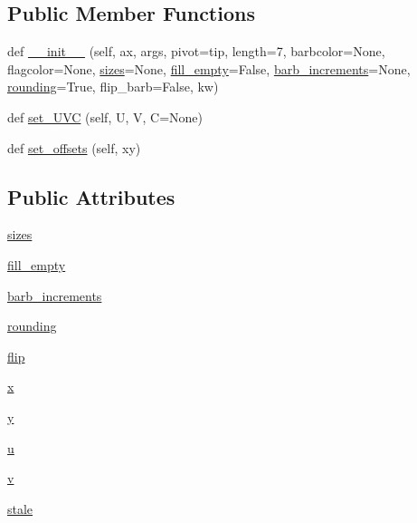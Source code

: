 \subsection*{Public Member Functions}
\begin{DoxyCompactItemize}
\item 
def \hyperlink{classmatplotlib_1_1quiver_1_1Barbs_a7c8dec1ccbe4ab0caf9fcd4a13e77488}{\+\_\+\+\_\+init\+\_\+\+\_\+} (self, ax, args, pivot=\textquotesingle{}tip\textquotesingle{}, length=7, barbcolor=None, flagcolor=None, \hyperlink{classmatplotlib_1_1quiver_1_1Barbs_a06f1946ae1eaf6fb7f2e7ad12fd95360}{sizes}=None, \hyperlink{classmatplotlib_1_1quiver_1_1Barbs_a88c2902650f34aa8e23060a0891b61fb}{fill\+\_\+empty}=False, \hyperlink{classmatplotlib_1_1quiver_1_1Barbs_a49c13662e7240845848dd46d9ba79ea5}{barb\+\_\+increments}=None, \hyperlink{classmatplotlib_1_1quiver_1_1Barbs_ab46003486181cfa9f8efcdbc39008426}{rounding}=True, flip\+\_\+barb=False, kw)
\item 
def \hyperlink{classmatplotlib_1_1quiver_1_1Barbs_a963364dac5799ec94485ab80c5ea9de4}{set\+\_\+\+U\+VC} (self, U, V, C=None)
\item 
def \hyperlink{classmatplotlib_1_1quiver_1_1Barbs_ab1500541958a20b317abe5ec916bc681}{set\+\_\+offsets} (self, xy)
\end{DoxyCompactItemize}
\subsection*{Public Attributes}
\begin{DoxyCompactItemize}
\item 
\hyperlink{classmatplotlib_1_1quiver_1_1Barbs_a06f1946ae1eaf6fb7f2e7ad12fd95360}{sizes}
\item 
\hyperlink{classmatplotlib_1_1quiver_1_1Barbs_a88c2902650f34aa8e23060a0891b61fb}{fill\+\_\+empty}
\item 
\hyperlink{classmatplotlib_1_1quiver_1_1Barbs_a49c13662e7240845848dd46d9ba79ea5}{barb\+\_\+increments}
\item 
\hyperlink{classmatplotlib_1_1quiver_1_1Barbs_ab46003486181cfa9f8efcdbc39008426}{rounding}
\item 
\hyperlink{classmatplotlib_1_1quiver_1_1Barbs_af39393a7267578bd4adb5d3a5e673c40}{flip}
\item 
\hyperlink{classmatplotlib_1_1quiver_1_1Barbs_a79eda277a699d588bd88ebf2d7be9306}{x}
\item 
\hyperlink{classmatplotlib_1_1quiver_1_1Barbs_a3137a5e02dce7821d54630c32c83e783}{y}
\item 
\hyperlink{classmatplotlib_1_1quiver_1_1Barbs_afc79728b9563ca2941cb2cc11d7e552f}{u}
\item 
\hyperlink{classmatplotlib_1_1quiver_1_1Barbs_a02ffc7b07abef03235c448606c614f4a}{v}
\item 
\hyperlink{classmatplotlib_1_1quiver_1_1Barbs_a00d30daf4856d2c5ee985913ebc87d80}{stale}
\end{DoxyCompactItemize}

